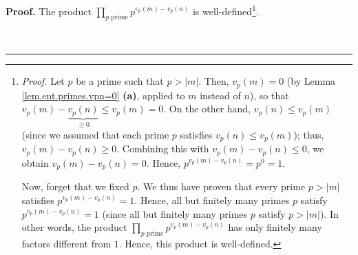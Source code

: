 \documentclass[numbers=enddot,12pt,final,onecolumn,notitlepage]{scrartcl}%
\numberwithin{exer}{subsection}
\theoremstyle{definition}
\newenvironment{proof}[1][Proof]{\noindent\textbf{#1.} }{\ \rule{0.5em}{0.5em}}
\let\prodnonlimits\prod
\renewcommand{\prod}{\prodnonlimits\limits}
\begin{document}
\begin{proof}
The product $\prod_{p\text{ prime}}p^{v_{p}\left(  m\right)  -v_{p}\left(
n\right)  }$ is well-defined\footnote{\textit{Proof. }Let $p$ be a prime such
that $p>\left\vert m\right\vert $. Then, $v_{p}\left(  m\right)  =0$ (by Lemma
\ref{lem.ent.primes.vpn=0} \textbf{(a)}, applied to $m$ instead of $n$), so
that $v_{p}\left(  m\right)  -\underbrace{v_{p}\left(  n\right)  }_{\geq0}\leq
v_{p}\left(  m\right)  =0$. On the other hand, $v_{p}\left(  n\right)  \leq
v_{p}\left(  m\right)  $ (since we assumed that each prime $p$ satisfies
$v_{p}\left(  n\right)  \leq v_{p}\left(  m\right)  $); thus, $v_{p}\left(
m\right)  -v_{p}\left(  n\right)  \geq0$. Combining this with $v_{p}\left(
m\right)  -v_{p}\left(  n\right)  \leq0$, we obtain $v_{p}\left(  m\right)
-v_{p}\left(  n\right)  =0$. Hence, $p^{v_{p}\left(  m\right)  -v_{p}\left(
n\right)  }=p^{0}=1$.
\par
Now, forget that we fixed $p$. We thus have proven that every prime
$p>\left\vert m\right\vert $ satisfies $p^{v_{p}\left(  m\right)
-v_{p}\left(  n\right)  }=1$. Hence, all but finitely many primes $p$ satisfy
$p^{v_{p}\left(  m\right)  -v_{p}\left(  n\right)  }=1$ (since all but
finitely many primes $p$ satisfy $p>\left\vert m\right\vert $). In other
words, the product $\prod_{p\text{ prime}}p^{v_{p}\left(  m\right)
-v_{p}\left(  n\right)  }$ has only finitely many factors different from $1$.
Hence, this product is well-defined.}.


\end{proof}
\end{document}
